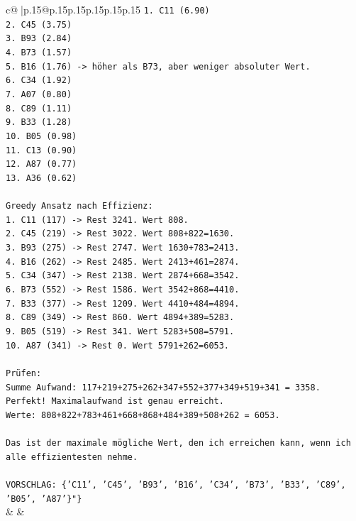 \documentclass{article}
\begin{document}
{\begin{supertabular}{c@{$\;$}|p{.15\linewidth}@{}p{.15\linewidth}p{.15\linewidth}p{.15\linewidth}p{.15\linewidth}p{.15\linewidth}}
{{{\texttt{1. C11 (6.90)} \\
\texttt{2. C45 (3.75)} \\
\texttt{3. B93 (2.84)} \\
\texttt{4. B73 (1.57)} \\
\texttt{5. B16 (1.76) {-}> höher als B73, aber weniger absoluter Wert.} \\
\texttt{6. C34 (1.92)} \\
\texttt{7. A07 (0.80)} \\
\texttt{8. C89 (1.11)} \\
\texttt{9. B33 (1.28)} \\
\texttt{10. B05 (0.98)} \\
\texttt{11. C13 (0.90)} \\
\texttt{12. A87 (0.77)} \\
\texttt{13. A36 (0.62)} \\
\\ 
\texttt{Greedy Ansatz nach Effizienz:} \\
\texttt{1. C11 (117) {-}> Rest 3241. Wert 808.} \\
\texttt{2. C45 (219) {-}> Rest 3022. Wert 808+822=1630.} \\
\texttt{3. B93 (275) {-}> Rest 2747. Wert 1630+783=2413.} \\
\texttt{4. B16 (262) {-}> Rest 2485. Wert 2413+461=2874.} \\
\texttt{5. C34 (347) {-}> Rest 2138. Wert 2874+668=3542.} \\
\texttt{6. B73 (552) {-}> Rest 1586. Wert 3542+868=4410.} \\
\texttt{7. B33 (377) {-}> Rest 1209. Wert 4410+484=4894.} \\
\texttt{8. C89 (349) {-}> Rest 860. Wert 4894+389=5283.} \\
\texttt{9. B05 (519) {-}> Rest 341. Wert 5283+508=5791.} \\
\texttt{10. A87 (341) {-}> Rest 0. Wert 5791+262=6053.} \\
\\ 
\texttt{Prüfen:} \\
\texttt{Summe Aufwand: 117+219+275+262+347+552+377+349+519+341 = 3358.} \\
\texttt{Perfekt! Maximalaufwand ist genau erreicht.} \\
\texttt{Werte: 808+822+783+461+668+868+484+389+508+262 = 6053.} \\
\\ 
\texttt{Das ist der maximale mögliche Wert, den ich erreichen kann, wenn ich alle effizientesten nehme.} \\
\\ 
\texttt{VORSCHLAG: \{'C11', 'C45', 'B93', 'B16', 'C34', 'B73', 'B33', 'C89', 'B05', 'A87'\}"\}} \\
            }
        }
    }
    & & \\ \\


\end{supertabular}}
\end{document}
